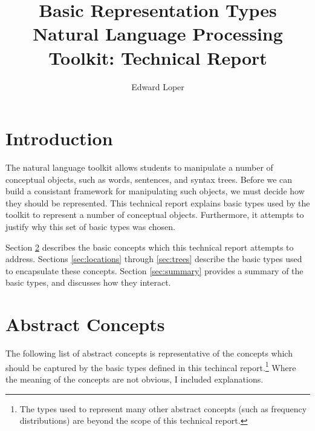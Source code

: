 \documentclass{article}
\begin{document}
\title{Basic Representation Types\\
\Large Natural Language Processing Toolkit: Technical Report}
\author{Edward Loper}
\maketitle

\section{Introduction}

  The natural language toolkit allows students to manipulate a number
  of conceptual objects, such as words, sentences, and syntax trees.
  Before we can build a consistant framework for manipulating such
  objects, we must decide how they should be represented.  This
  technical report explains basic types used by the toolkit to
  represent a number of conceptual objects.  Furthermore, it attempts
  to justify why this set of basic types was chosen.

  Section \ref{sec:concepts} describes the basic concepts which this
  technical report attempts to address.  Sections \ref{sec:locations}
  through \ref{sec:trees} describe the basic types used to encapsulate
  these concepts.  Section \ref{sec:summary} provides a summary of the
  basic types, and discusses how they interact.

\newpage
\section{Abstract Concepts}
\label{sec:concepts}

  The following list of abstract concepts is representative of the
  concepts which should be captured by the basic types defined in this
  techincal report.\footnote{The types used to represent many other
  abstract concepts (such as frequency distributions) are beyond the
  scope of this technical report.}  Where the meaning of the concepts
  are not obvious, I included explanations.
\end{document}
